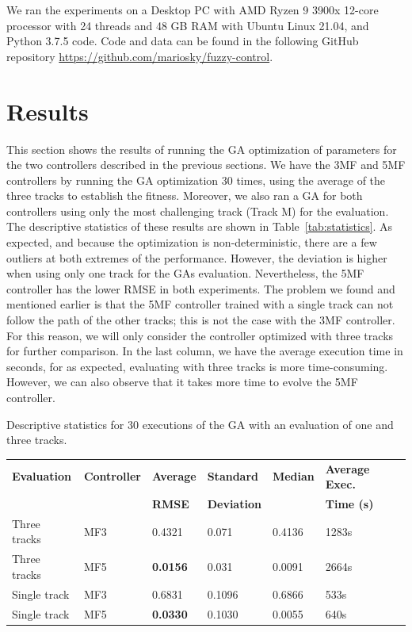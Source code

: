 \documentclass[symmetry,article,submit,moreauthors,pdftex]{Definitions/mdpi}
\begin{document}
We ran the experiments on a Desktop PC with AMD Ryzen 9 3900x 12-core processor
with 24 threads and 48 GB RAM with Ubuntu Linux 21.04, and Python 3.7.5 code.
Code and data can be found in the following GitHub repository
\url{https://github.com/mariosky/fuzzy-control}.




\section{Results}\label{Results}

This section shows the results of running the GA optimization of parameters for
the two controllers described in the previous sections. We have the 3MF and 5MF
controllers by running the GA optimization 30 times, using the average of the
three tracks to establish the fitness.  Moreover, we also ran a GA for both
controllers using only the most challenging track (Track M) for the evaluation.
The descriptive statistics of these results are shown in
Table~\ref{tab:statistics}.  As expected, and because the optimization is
non-deterministic, there are a few outliers at both extremes of the
performance. However, the deviation is higher when using only one track for the
GAs evaluation. Nevertheless, the 5MF controller has the lower RMSE in both
experiments.  The problem we found and mentioned earlier is that the 5MF
controller trained with a single track can not follow the path of the other
tracks; this is not the case with the 3MF controller.  For this reason, we will
only consider the controller optimized with three tracks for further
comparison. In the last column, we have the average execution time in seconds,
for as expected, evaluating with three tracks is more time-consuming. However,
we can also observe that it takes more time to evolve the 5MF controller. 

\begin{specialtable}[H] 
\small
\caption{Descriptive statistics for 30 executions of the GA with an evaluation
    of one and three tracks.}\label{tab:statistics}
\begin{tabular}{llllll}
\toprule
\textbf{Evaluation} & \textbf{Controller} & \textbf{Average }	& \textbf{Standard } &\textbf{Median}	& \textbf{Average Exec. }\\
                    &                     & \textbf{RMSE}	& \textbf{ Deviation} &\textbf{}	& \textbf{Time (s)}\\
\midrule
Three tracks & MF3 & 0.4321 & 0.071 & 0.4136 & 1283s \\
Three tracks & MF5 & \textbf{0.0156} & 0.031 & 0.0091 & 2664s \\
\midrule
Single track & MF3 & 0.6831 & 0.1096 & 0.6866 & 533s \\
Single track & MF5 & \textbf{0.0330} & 0.1030 & 0.0055 & 640s \\
\bottomrule
\end{tabular}
\end{specialtable}
\end{document}
